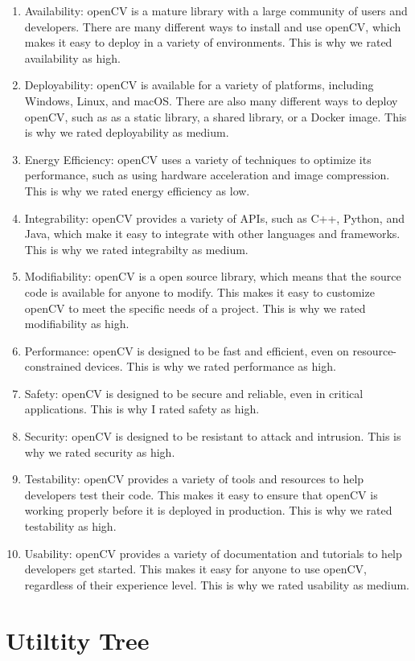 \begin{enumerate}
    \item Availability: openCV is a mature library with a large community of users and developers. There are many different ways to install and use openCV, which makes it easy to deploy in a variety of environments. This is why we rated availability as high.
    \item Deployability: openCV is available for a variety of platforms, including Windows, Linux, and macOS. There are also many different ways to deploy openCV, such as as a static library, a shared library, or a Docker image. This is why we rated deployability as medium.
    \item Energy Efficiency: openCV uses a variety of techniques to optimize its performance, such as using hardware acceleration and image compression. This is why we rated energy efficiency as low.
    \item Integrability: openCV provides a variety of APIs, such as C++, Python, and Java, which make it easy to integrate with other languages and frameworks. This is why we rated integrabilty as medium.
    \item Modifiability: openCV is a open source library, which means that the source code is available for anyone to modify. This makes it easy to customize openCV to meet the specific needs of a project. This is why we rated modifiability as high.
    \item Performance: openCV is designed to be fast and efficient, even on resource-constrained devices. This is why we rated performance as high.
    \item Safety: openCV is designed to be secure and reliable, even in critical applications. This is why I rated safety as high.
    \item Security: openCV is designed to be resistant to attack and intrusion. This is why we rated security as high.
    \item Testability: openCV provides a variety of tools and resources to help developers test their code. This makes it easy to ensure that openCV is working properly before it is deployed in production. This is why we rated testability as high.
    \item Usability: openCV provides a variety of documentation and tutorials to help developers get started. This makes it easy for anyone to use openCV, regardless of their experience level. This is why we rated usability as medium.
\end{enumerate}
\section{Utiltity Tree\label{Section::utilityTree}}
